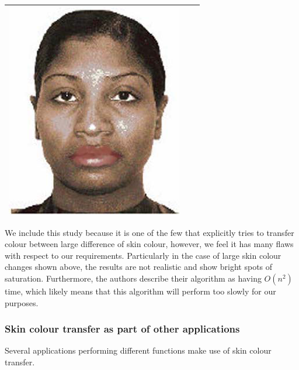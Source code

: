 \begin{table}[H]
\begin{tabular}{|c|c|c|}
\begin{minipage}{.29\textwidth}
    \includegraphics[width=\textwidth,height=\textheight,keepaspectratio]{images/yin_result1}
  \end{minipage} \\
    \hline
\end{tabular}
\end{table}

We include this study because it is one of the few that explicitly tries to transfer colour between large difference of skin colour, however, we feel it has many flaws with respect to our requirements. Particularly in the case of large skin colour changes shown above, the results are not realistic and show bright spots of saturation. Furthermore, the authors describe their algorithm as having $O(n^2)$ time, which likely means that this algorithm will perform too slowly for our purposes.



\subsubsection{Skin colour transfer as part of other applications}
Several applications performing different functions make use of skin colour transfer.

